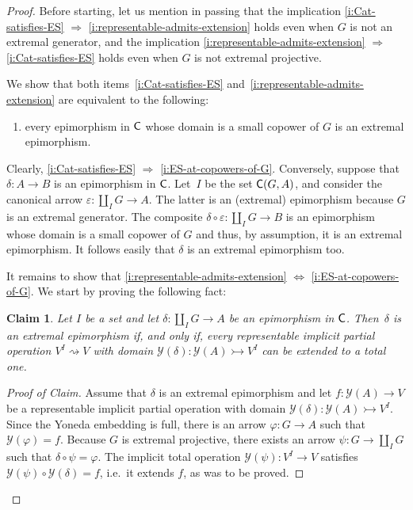 \documentclass[10pt,a4paper]{amsart}
\newtheorem{claim}{Claim}
\newcommand{\IFF}{\Leftrightarrow}						%
\newcommand{\IMP}{\Rightarrow}						%
\newcommand{\cat}{{\sf C}}								%
\renewcommand{\epsilon}{\varepsilon}
\renewcommand{\phi}{\varphi}
\newcommand{\yo}{\mathcal{Y}}
\begin{document}
\begin{proof}
Before starting, let us mention in passing that the implication \ref{i:Cat-satisfies-ES} $\IMP$ \ref{i:representable-admits-extension} holds even when $G$ is not an extremal generator, and the implication \ref{i:representable-admits-extension} $\IMP$ \ref{i:Cat-satisfies-ES} holds even when $G$ is not extremal projective. 

We show that both items~\ref{i:Cat-satisfies-ES} and~\ref{i:representable-admits-extension} are equivalent to the following: 
\begin{enumerate}[label=(\arabic*),resume=implicitops]
\item\label{i:ES-at-copowers-of-G} every epimorphism in $\cat$ whose domain is a small copower of $G$ is an extremal epimorphism.
\end{enumerate}

Clearly, \ref{i:Cat-satisfies-ES} $\IMP$ \ref{i:ES-at-copowers-of-G}. Conversely, suppose that $\delta\colon A\to B$ is an epimorphism in $\cat$. Let~$I$ be the set $\cat(G,A)$, and consider the canonical arrow $\epsilon\colon \coprod_{I}G \to A$. The latter is an (extremal) epimorphism because $G$ is an extremal generator. The composite $\delta\circ \epsilon \colon \coprod_{I}G \to B$ is an epimorphism whose domain is a small copower of $G$ and thus, by assumption, it is an extremal epimorphism. It follows easily that $\delta$ is an extremal epimorphism too.

It remains to show that \ref{i:representable-admits-extension} $\IFF$ \ref{i:ES-at-copowers-of-G}. We start by proving the following fact:
%
\begin{claim}\label{claim:ext-epi-iff-total}
Let $I$ be a set and let $\delta\colon \coprod_{I}G \to A$ be an epimorphism in $\cat$. Then~$\delta$ is an extremal epimorphism if, and only if, every representable implicit partial operation $V^{I} \rightsquigarrow V$ with domain $\yo(\delta)\colon \yo(A)\rightarrowtail V^{I}$ can be extended to a total one.
\end{claim}
%
\begin{proof}[Proof of Claim]
Assume that $\delta$ is an extremal epimorphism and let $f\colon \yo(A)\to V$ be a representable implicit partial operation with domain $\yo(\delta)\colon \yo(A)\rightarrowtail V^{I}$. Since the Yoneda embedding is full, there is an arrow $\phi\colon G\to A$ such that $\yo(\phi)=f$. Because $G$ is extremal projective, there exists an arrow $\psi\colon G\to \coprod_{I}{G}$ such that $\delta\circ \psi = \phi$. The implicit total operation $\yo(\psi)\colon V^{I}\to V$ satisfies $\yo(\psi)\circ \yo(\delta) = f$, i.e.\ it extends $f$, as was to be proved.


\end{proof}
\end{proof}
\end{document}
